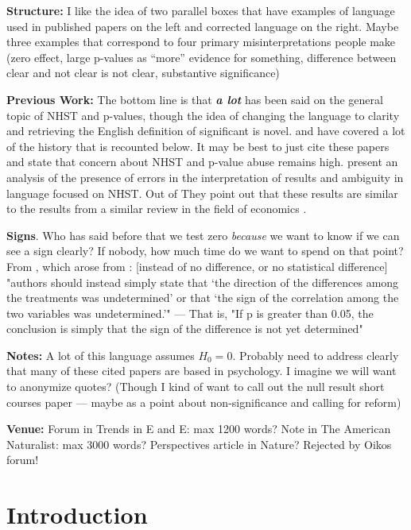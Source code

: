 \textbf{Structure:} I like the idea of two parallel boxes that have examples of language used in published papers on the
left and corrected language on the right.
Maybe three examples that correspond to four primary misinterpretations people
make (zero effect, large p-values as ``more'' evidence for something, difference between clear and not clear is not clear,
substantive significance)

\textbf{Previous Work:} The bottom line is that \emph{\textbf{a lot}} has been said on the general topic of NHST and 
p-values, though the idea of changing the language to clarity and retrieving the English definition of significant
is novel.
\citet{Bernardietal.2017} and \citet{McShaneetal.2017} have covered a lot of the history that is
recounted below.
It may be best to just cite these papers and state that concern about NHST and p-value abuse 
remains high.
\citep{Bernardietal.2017} present an analysis of the presence of errors in the interpretation of 
results and ambiguity in language focused on NHST. Out of  They point out that these results are similar to the
results from a similar review in the field of economics \citep{ZiliakandMcCloskey2008}.

\textbf{Signs}.
Who has said before that we test zero \emph{because} we want to know if we can see a sign clearly? If nobody, how much time do we want to spend on that point? 
From \citet{robinson2001past}, which arose from \citet{jones2000sensible}: [instead of no difference, or no statistical difference] "authors should instead simply state that `the direction of the differences among the treatments was undetermined' or that `the sign of the correlation among the two variables was undetermined.'" --- That is, "If p is greater than 0.05, the conclusion is simply that the sign of the difference is not yet determined"

\textbf{Notes:} A lot of this language assumes $H_{0} = 0$. Probably need to address clearly that many of these cited
papers are based in psychology.
I imagine we will want to anonymize quotes? (Though I kind of want to call out the null
result short courses paper --- maybe as a point about non-significance and calling for reform)

\textbf{Venue:} Forum in Trends in E and E: max 1200 words?
Note in The American Naturalist: max 3000 words? Perspectives article in Nature?
Rejected by Oikos forum!

\clearpage

\section*{Introduction}

